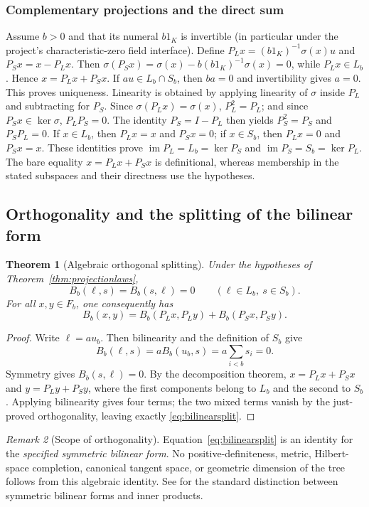 \documentclass[11pt,reqno]{amsart}
\newtheorem{theorem}{Theorem}[section]
\theoremstyle{definition}\newtheorem{definition}[theorem]{Definition}
\theoremstyle{remark}\newtheorem{remark}[theorem]{Remark}
\begin{document}
\medskip
\subsubsection*{Complementary projections and the direct sum}\label{supp:8-7}
Assume $b>0$ and that its numeral $b1_K$ is invertible (in particular under the project's characteristic-zero field interface). Define $P_Lx=(b1_K)^{-1}\sigma(x)u$ and $P_Sx=x-P_Lx$. Then $\sigma(P_Sx)=\sigma(x)-b(b1_K)^{-1}\sigma(x)=0$, while $P_Lx\in L_b$. Hence $x=P_Lx+P_Sx$. If $au\in L_b\cap S_b$, then $ba=0$ and invertibility gives $a=0$. This proves uniqueness. Linearity is obtained by applying linearity of $\sigma$ inside $P_L$ and subtracting for $P_S$. Since $\sigma(P_Lx)=\sigma(x)$, $P_L^2=P_L$; and since $P_Sx\in\ker\sigma$, $P_LP_S=0$. The identity $P_S=I-P_L$ then yields $P_S^2=P_S$ and $P_SP_L=0$. If $x\in L_b$, then $P_Lx=x$ and $P_Sx=0$; if $x\in S_b$, then $P_Lx=0$ and $P_Sx=x$. These identities prove $\operatorname{im}P_L=L_b=\ker P_S$ and $\operatorname{im}P_S=S_b=\ker P_L$. The bare equality $x=P_Lx+P_Sx$ is definitional, whereas membership in the stated subspaces and their directness use the hypotheses.
\medskip

\subsection{Orthogonality and the splitting of the bilinear form}\label{main:sub-26}
\begin{theorem}[Algebraic orthogonal splitting]\label{thm:bilinearsplit}
Under the hypotheses of Theorem~\ref{thm:projectionlaws},
\[
 B_b(\ell,s)=B_b(s,\ell)=0\qquad
 (\ell\in L_b,\ s\in S_b).
\]
For all $x,y\in F_b$, one consequently has
\begin{equation}\label{eq:bilinearsplit}
 B_b(x,y)=B_b(P_Lx,P_Ly)+B_b(P_Sx,P_Sy).
\end{equation}
\end{theorem}
\begin{proof}
Write $\ell=a u_b$. Then bilinearity and the definition of $S_b$ give
\[
 B_b(\ell,s)=a B_b(u_b,s)
 =a\sum_{i<b}s_i=0.
\]
Symmetry gives $B_b(s,\ell)=0$. By the decomposition theorem,
$x=P_Lx+P_Sx$ and $y=P_Ly+P_Sy$, where the first components belong to $L_b$ and the second to $S_b$. Applying bilinearity gives four terms; the two mixed terms vanish by the just-proved orthogonality, leaving exactly \eqref{eq:bilinearsplit}.
\end{proof}

\begin{remark}[Scope of orthogonality]
Equation~\eqref{eq:bilinearsplit} is an identity for the \emph{specified symmetric bilinear form}. No positive-definiteness, metric, Hilbert-space completion, canonical tangent space, or geometric dimension of the tree follows from this algebraic identity. See \cite[\S 9A]{axler} for the standard distinction between symmetric bilinear forms and inner products.
\end{remark}
\end{document}
